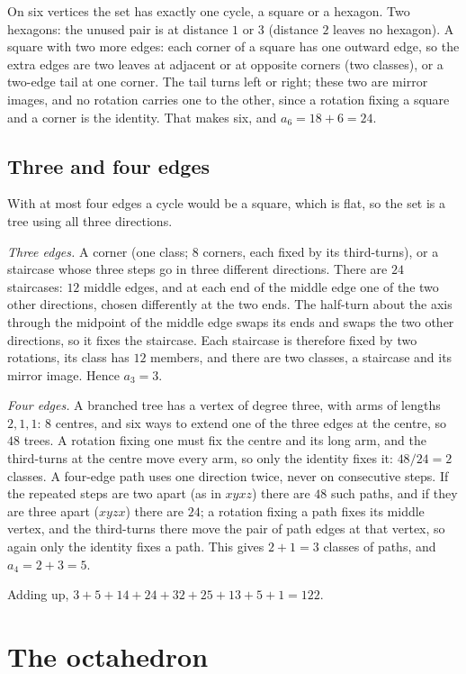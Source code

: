 \documentclass[11pt]{amsart}
\theoremstyle{remark}
\begin{document}
On six vertices the set has exactly one cycle, a square or a hexagon. Two hexagons: the unused pair is at distance $1$ or $3$ (distance $2$ leaves no hexagon). A square with two more edges: each corner of a square has one outward edge, so the extra edges are two leaves at adjacent or at opposite corners (two classes), or a two-edge tail at one corner. The tail turns left or right; these two are mirror images, and no rotation carries one to the other, since a rotation fixing a square and a corner is the identity. That makes six, and $a_6=18+6=24$.

\subsection{Three and four edges}

With at most four edges a cycle would be a square, which is flat, so the set is a tree using all three directions.

\emph{Three edges.} A corner (one class; $8$ corners, each fixed by its third-turns), or a staircase whose three steps go in three different directions. There are $24$ staircases: $12$ middle edges, and at each end of the middle edge one of the two other directions, chosen differently at the two ends. The half-turn about the axis through the midpoint of the middle edge swaps its ends and swaps the two other directions, so it fixes the staircase. Each staircase is therefore fixed by two rotations, its class has $12$ members, and there are two classes, a staircase and its mirror image. Hence $a_3=3$.

\emph{Four edges.} A branched tree has a vertex of degree three, with arms of lengths $2,1,1$: $8$ centres, and six ways to extend one of the three edges at the centre, so $48$ trees. A rotation fixing one must fix the centre and its long arm, and the third-turns at the centre move every arm, so only the identity fixes it: $48/24=2$ classes. A four-edge path uses one direction twice, never on consecutive steps. If the repeated steps are two apart (as in $xyxz$) there are $48$ such paths, and if they are three apart ($xyzx$) there are $24$; a rotation fixing a path fixes its middle vertex, and the third-turns there move the pair of path edges at that vertex, so again only the identity fixes a path. This gives $2+1=3$ classes of paths, and $a_4=2+3=5$.

Adding up, $3+5+14+24+32+25+13+5+1=122$.

\section{The octahedron}
\end{document}
